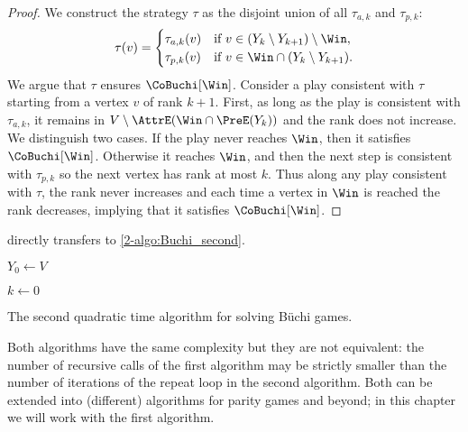 \begin{proof}
We construct the strategy $\tau$ as the disjoint union of all $\tau_{a,k}$ and $\tau_{p,k}$:
\[
\tau(v) = 
\begin{cases}
\tau_{a,k}(v) & \text{if } v \in (Y_k \setminus Y_{k+1}) \setminus \Win, \\
\tau_{p,k}(v) & \text{if } v \in \Win \cap (Y_k \setminus Y_{k+1}).
\end{cases}
\]
We argue that $\tau$ ensures $\CoBuchi[\Win]$. 
Consider a play consistent with $\tau$ starting from a vertex $v$ of rank $k+1$.
First, as long as the play is consistent with $\tau_{a,k}$, it remains in $V \setminus \AttrE(\Win \cap \PreE(Y_k))$
and the rank does not increase.
We distinguish two cases.
If the play never reaches $\Win$, then it satisfies $\CoBuchi[\Win]$.
Otherwise it reaches $\Win$, and then the next step is consistent with $\tau_{p,k}$ 
so the next vertex has rank at most $k$.
Thus along any play consistent with $\tau$, the rank never increases and each time a vertex in $\Win$ is reached the rank decreases,
implying that it satisfies $\CoBuchi[\Win]$.
\end{proof}

 directly transfers to \cref{2-algo:Buchi_second}.

\begin{algorithm}

$Y_0 \leftarrow V$ 

$k \leftarrow 0$ 
     

\caption{The second quadratic time algorithm for solving B{\"uchi} games.}
\label{2-algo:Buchi_second}
\end{algorithm}

\begin{remark}
Both algorithms have the same complexity but they are not equivalent: the number of recursive calls of the first algorithm
may be strictly smaller than the number of iterations of the repeat loop in the second algorithm.
Both can be extended into (different) algorithms for parity games and beyond; in this chapter we will work with the first algorithm.
\end{remark}